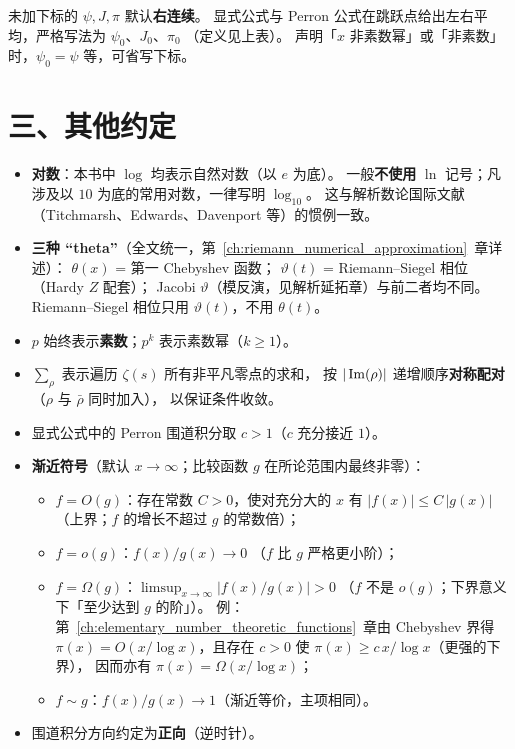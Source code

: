 未加下标的 $\psi,J,\pi$ 默认\textbf{右连续}。
显式公式与 Perron 公式在跳跃点给出左右平均，严格写法为 $\psi_0$、$J_0$、$\pi_0$
（定义见上表）。
声明「$x$ 非素数幂」或「非素数」时，$\psi_0=\psi$ 等，可省写下标。

\section*{三、其他约定}

\begin{itemize}
  \item \textbf{对数}：本书中 $\log$ 均表示自然对数（以 $e$ 为底）。
        一般\textbf{不使用} $\ln$ 记号；凡涉及以 $10$ 为底的常用对数，一律写明 $\log_{10}$。
        这与解析数论国际文献（Titchmarsh、Edwards、Davenport 等）的惯例一致。
  \item \textbf{三种 “theta”}（全文统一，第~\ref{ch:riemann_numerical_approximation}~章详述）：
        $\theta(x)$ = 第一 Chebyshev 函数；
        $\vartheta(t)$ = Riemann--Siegel 相位（Hardy $Z$ 配套）；
        Jacobi $\vartheta$（模反演，见解析延拓章）与前二者均不同。
        Riemann--Siegel 相位只用 $\vartheta(t)$，不用 $\theta(t)$。
  \item $p$ 始终表示\textbf{素数}；$p^k$ 表示素数幂（$k\ge 1$）。
  \item $\sum_\rho$ 表示遍历 $\zeta(s)$ 所有非平凡零点的求和，
        按 $|\operatorname{Im}(\rho)|$ 递增顺序\textbf{对称配对}（$\rho$ 与 $\bar\rho$ 同时加入），
        以保证条件收敛。
  \item 显式公式中的 Perron 围道积分取 $c>1$（$c$ 充分接近 $1$）。
  \item \textbf{渐近符号}（默认 $x\to\infty$；比较函数 $g$ 在所论范围内最终非零）：
        \begin{itemize}
          \item $f=O(g)$：存在常数 $C>0$，使对充分大的 $x$ 有 $|f(x)|\le C\,|g(x)|$
                （上界；$f$ 的增长不超过 $g$ 的常数倍）；
          \item $f=o(g)$：$f(x)/g(x)\to 0$
                （$f$ 比 $g$ 严格更小阶）；
          \item $f=\Omega(g)$：$\limsup_{x\to\infty}\bigl|f(x)/g(x)\bigr|>0$
                （$f$ 不是 $o(g)$；下界意义下「至少达到 $g$ 的阶」）。
                例：第~\ref{ch:elementary_number_theoretic_functions}~章由 Chebyshev 界得
                $\pi(x)=O(x/\log x)$，且存在 $c>0$ 使 $\pi(x)\ge c\,x/\log x$（更强的下界），
                因而亦有 $\pi(x)=\Omega(x/\log x)$；
          \item $f\sim g$：$f(x)/g(x)\to 1$（渐近等价，主项相同）。
        \end{itemize}
  \item 围道积分方向约定为\textbf{正向}（逆时针）。
\end{itemize}
